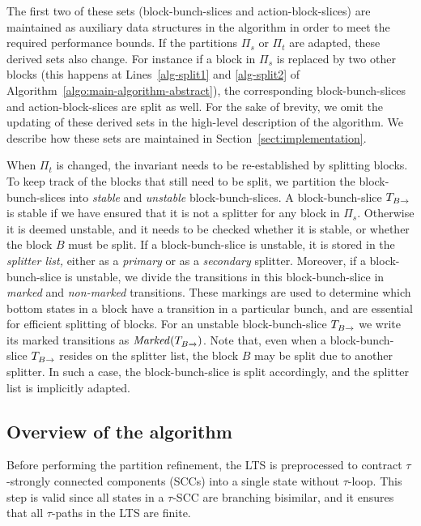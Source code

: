 \documentclass[a4paper,10pt]{article}
\theoremstyle{definition}
\theoremstyle{plain}
\newcommand{\pijl}[1]{\mathrel{\text{$\xrightarrow{\smash[t]{#1}}$}}}
\newcommand{\remark}[1]{}
\newcommand{\dnj}[1]{\remark{\textcolor{red}{David: #1}}}
\newcommand{\TB}{T_{B\pijl{}}}
\newcommand{\Marked}{\mathit{Marked}}
\begin{document}
The first two of these sets (block-bunch-slices and action-block-slices) are maintained as auxiliary data structures in the algorithm in order to meet the required performance bounds.
If the partitions $\Pi_s$ or $\Pi_t$ are adapted,
these derived sets also change. For instance if a block in $\Pi_s$ is replaced by two other blocks
(this happens at Lines~\ref{alg-split1} and \ref{alg-split2} of Algorithm~\ref{algo:main-algorithm-abstract}),
the corresponding block-bunch-slices and action-block-slices are split as well.
For the sake of brevity, we omit the updating of these derived sets in the high-level description of the algorithm. We describe how these sets are maintained in Section~\ref{sect:implementation}.

When $\Pi_t$ is changed, the invariant needs to be re-established by splitting blocks.
To keep track of the blocks that still need to be split, we partition the block-bunch-slices into \textit{stable} and \textit{unstable} block-bunch-slices.
A block-bunch-slice $\TB$ is stable if we have ensured that it is not a splitter for any block in $\Pi_s$.
Otherwise it is deemed unstable, and it needs to be checked whether it is stable, or whether the block $B$ must be split.
If a block-bunch-slice is unstable,
it is stored in the \emph{splitter list,} either as a \textit{primary} or as a \textit{secondary} splitter.
Moreover, if a block-bunch-slice is unstable, we divide the transitions in this block-bunch-slice in
\textit{marked} and \textit{non-marked} transitions.
These markings are used to determine
which bottom states in a block have a transition in a particular bunch, and are essential for efficient splitting of blocks.
For an unstable block-bunch-slice $\TB$ we write its marked transitions as $\Marked(\TB)$.
Note that, even when a block-bunch-slice $\TB$ resides on the splitter list, the block $B$ may be split due to another splitter. In such a case, the block-bunch-slice is split accordingly, and the splitter list is implicitly adapted.

\subsection{Overview of the algorithm}

Before performing the partition refinement,
the LTS is preprocessed to contract $\tau$-strongly connected components (SCCs) into a single state without $\tau$-loop.
This step is valid since all states in a $\tau$-SCC are branching bisimilar,
and it ensures that all $\tau$-paths in the LTS are finite.
\end{document}
